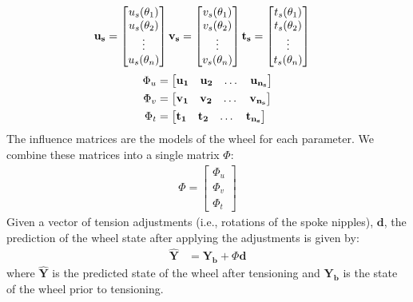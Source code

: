 \documentclass[journal]{IEEEtran}
\begin{document}
\begin{align*}
    \bf u_s &=  \begin{bmatrix}
        u_s(\theta_1)\\
        u_s(\theta_2)\\
        \vdots\\
        u_s(\theta_n)
        \end{bmatrix}
    \bf v_s = \begin{bmatrix}
        v_s(\theta_1)\\
        v_s(\theta_2)\\
        \vdots\\
        v_s(\theta_n)
    \end{bmatrix}
        \bf t_s = \begin{bmatrix}
        t_s(\theta_1)\\
        t_s(\theta_2)\\
        \vdots\\
        t_s(\theta_n)
    \end{bmatrix}
    \end{align*}
    \begin{align*}
     \Phi_u &= \begin{bmatrix}
     \bf u_1 & \bf u_2& \dots & \bf u_{n_s}
     \end{bmatrix}\\
     \Phi_v &= \begin{bmatrix}
     \bf v_1 & \bf v_2& \dots & \bf v_{n_s}
     \end{bmatrix}\\     
     \Phi_t &= \begin{bmatrix}
     \bf t_1 & \bf t_2& \dots & \bf t_{n_s}
     \end{bmatrix} 
\end{align*}
The influence matrices are the models of the wheel for each parameter.  We combine these matrices into a single matrix $\Phi$:
 \begin{align}
 \Phi = 
     \begin{bmatrix}
         \Phi_u\\
         \Phi_v\\
         \Phi_t
     \end{bmatrix}
     \label{eq:phi}
 \end{align}
Given a vector of tension adjustments (i.e., rotations of the spoke nipples), $\mathbf d$, the prediction of the wheel state after applying the adjustments is given by:
\begin{align}
\mathbf{\hat Y} &= 
     \mathbf{Y_b} + \Phi  \mathbf{d} 
     \label{eq:Y_hat}
 \end{align}
where $\mathbf{\hat Y}$ is the predicted state of the wheel after tensioning and $\mathbf{Y_b}$ is the state of the wheel prior to tensioning. 
\end{document}
